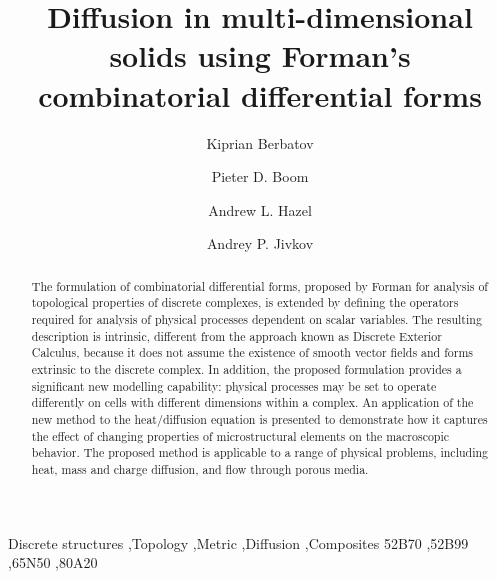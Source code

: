 \documentclass{elsarticle}
\theoremstyle{definition}
\begin{document}
\begin{frontmatter}

\title{Diffusion in multi-dimensional solids using Forman's combinatorial differential forms}
\author[1]{Kiprian Berbatov}
\author[1]{Pieter D. Boom}
\author[2]{Andrew L. Hazel}
\author[1]{Andrey P. Jivkov}
\address[1]{Department of Mechanical, Aerospace and Civil Engineering, The University of Manchester, Oxford Road, Manchester M13 9PL, UK}
\address[2]{Department of Mathematics, The University of Manchester, Oxford Road, Manchester M13 9PL, UK}

\begin{abstract}
 The formulation of combinatorial differential forms, proposed by Forman for analysis of topological properties of discrete complexes, is extended by defining the operators required for analysis of physical processes dependent on scalar variables. The resulting description is intrinsic, different from the approach known as Discrete Exterior Calculus, because it does not assume the existence of smooth vector fields and forms extrinsic to the discrete complex. In addition, the proposed formulation provides a significant new modelling capability: physical processes may be set to operate differently on cells with different dimensions within a complex. An application of the new method to the heat/diffusion equation is presented to demonstrate how it captures the effect of changing properties of microstructural elements on the macroscopic behavior. The proposed method is applicable to a range of physical problems, including heat, mass and charge diffusion, and flow through porous media.
\end{abstract}

\begin{keyword}
 Discrete structures \sep Topology \sep Metric \sep Diffusion \sep Composites
 \MSC[2010] 52B70 \sep 52B99 \sep 65N50 \sep 80A20
\end{keyword}

\end{frontmatter}
\end{document}
